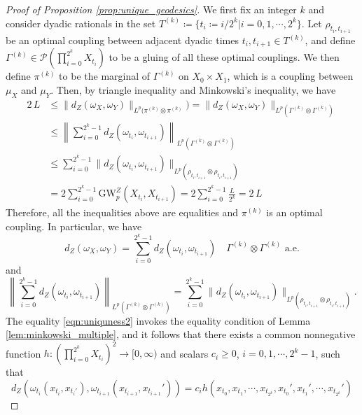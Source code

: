 \documentclass{article}
\theoremstyle{definition}
\newcommand{\dgwz}{\mathrm{GW}_p^Z}
\begin{document}
\begin{proof}[Proof of Proposition \ref{prop:unique_geodesics}]
    
    We first fix an integer $k$ and consider dyadic rationals in the set $T^{(k)} \coloneqq \{t_i \coloneqq i/2^k|i=0,1,\cdots, 2^k\}$. Let $\rho_{t_i,t_{i+1}}$ be an optimal coupling between adjacent dyadic times $t_i,t_{i+1} \in T^{(k)}$, and define $\Gamma^{(k)} \in \mathcal{P}\left(\prod_{i=0}^{2^k} X_{t_{i}}\right)$ to be a gluing of all these optimal couplings. We then define $\pi^{(k)}$ to be the marginal of $\Gamma^{(k)}$ on $X_0 \times X_1$, which is a coupling between $\mu_X$ and $\mu_Y$. Then, by triangle inequality and Minkowski's inequality, we have
    \begin{align}
        2\,L &\leq \|d_Z(\omega_X, \omega_Y)\|_{L^p(\pi^{(k)}\otimes\pi^{(k)}}) = \|d_Z(\omega_X, \omega_Y)\|_{L^p(\Gamma^{(k)} \otimes \Gamma^{(k)})} \\
        &\leq \left\|\sum_{i=0}^{2^k - 1} d_Z(\omega_{t_{i}}, \omega_{t_{i+1}})\right\|_{L^p(\Gamma^{(k)}\otimes \Gamma^{(k)})} \\        
        &\leq \sum_{i=0}^{2^k - 1} \|d_Z(\omega_{t_{i}}, \omega_{t_{i+1}})\|_{L^p(\rho_{t_{i}, t_{i+1}}\otimes \rho_{t_{i}, t_{i+1}})} \\
        &= 2\sum_{i=0}^{2^k - 1} \dgwz(X_{t_{i}}, X_{t_{i+1}})
        = 2\sum_{i=0}^{2^k - 1} \frac{L}{2^k}
        = 2\,L
    \end{align}
    Therefore, all the inequalities above are equalities and $\pi^{(k)}$ is an optimal coupling. In particular, we have
    \begin{equation}\label{eqn:uniqueness1}
       d_Z(\omega_X, \omega_Y) = \sum_{i=0}^{2^k - 1} d_Z(\omega_{t_{i}}, \omega_{t_{i+1}}) \quad \Gamma^{(k)} \otimes \Gamma^{(k)} \textrm{ a.e.} 
    \end{equation}
    and
    \begin{equation}\label{eqn:uniquness2}
        \left\|\sum_{i=0}^{2^k - 1} d_Z(\omega_{t_{i}}, \omega_{t_{i+1}})\right\|_{L^p(\Gamma^{(k)}\otimes \Gamma^{(k)})} = \sum_{i=0}^{2^k - 1} \|d_Z(\omega_{t_{i}}, \omega_{t_{i+1}})\|_{L^p(\rho_{t_{i}, t_{i+1}}\otimes \rho_{t_{i}, t_{i+1}})}.
    \end{equation}
    The equality \eqref{eqn:uniquness2} invokes the equality condition of Lemma \ref{lem:minkowski_multiple}, and it follows that there exists a common nonnegative function $h:\left(\prod_{i=0}^{2^k} X_{t_{i}}\right)^2 \to [0,\infty)$ and scalars $c_i \geq 0$,  $i=0,1,\cdots, 2^k - 1$, such that  
    \begin{equation}
        d_Z(\omega_{t_{i}}(x_{t_i}, x_{t_i'}), \omega_{t_{i+1}}(x_{t_{i+1}}, x_{t_{i+1}}')) = c_i h(x_{t_0}, x_{t_1}, \cdots, x_{t_{2^k}}, x_{t_0}', x_{t_1}', \cdots, x_{t_{2^k}}')

\end{equation}
\end{proof}
\end{document}
